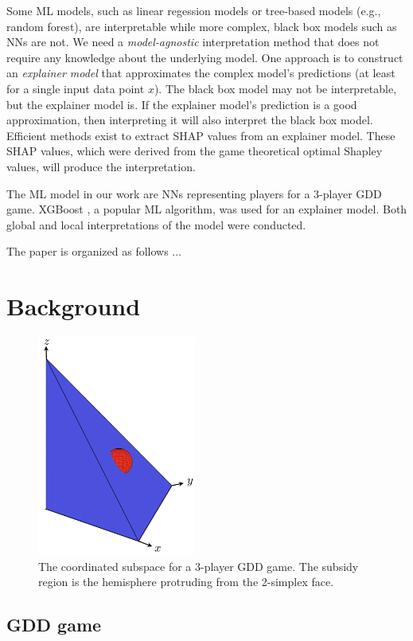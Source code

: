 \documentclass[journal]{IEEEtran} %
\begin{document}
Some ML models, such as linear regession models or tree-based models (e.g., random forest), are interpretable while more complex, black box models such as NNs are not. We need a \textit{model-agnostic} interpretation method that does not require any knowledge about the underlying model. One approach is to construct an \textit{explainer model} that approximates the complex model's predictions (at least for a single input data point $x$). The black box model may not be interpretable, but the explainer model is. If the explainer model's prediction is a good approximation, then interpreting it will also interpret the black box model. Efficient methods exist to extract SHAP values from an explainer model. These SHAP values, which were derived from the game 
theoretical optimal Shapley values, will produce the interpretation.  



The ML model in our work are NNs representing players for a 3-player GDD game. XGBoost \cite{xgb}, a popular ML algorithm, was used for an explainer model. Both global and local interpretations of the model were conducted.

The paper is organized as follows $\ldots$

\section{Background}\label{AA}

\begin{figure}[htbp]
    \centerline{\includegraphics[width=5.2cm]{subsidize.png}}
    \caption{The coordinated subspace for a 3-player GDD game. The subsidy region is the hemisphere protruding from the 2-simplex face.}
    \label{lidija2}
\end{figure}

\subsection{GDD game}
\end{document}
